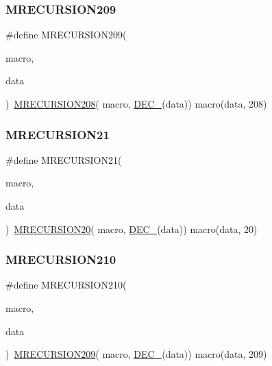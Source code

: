 \subsubsection{\texorpdfstring{MRECURSION209}{MRECURSION209}}
{\footnotesize\ttfamily \#define M\+R\+E\+C\+U\+R\+S\+I\+O\+N209(\begin{DoxyParamCaption}\item[{}]{macro,  }\item[{}]{data }\end{DoxyParamCaption})~\mbox{\hyperlink{group__group__sam0__utils__mrecursion_ga064aaf5aca80528731a580908f6a5142}{M\+R\+E\+C\+U\+R\+S\+I\+O\+N208}}(  macro, \mbox{\hyperlink{group__group__sam0__utils__mrecursion_ga1d23d683797679dca8c3512a54a5dcae}{D\+E\+C\+\_\+}}(data))   macro(data, 208)}

\mbox{\label{group__group__sam0__utils__mrecursion_ga077fdbda319ee988c77241afa1ff82f9}} 
\subsubsection{\texorpdfstring{MRECURSION21}{MRECURSION21}}
{\footnotesize\ttfamily \#define M\+R\+E\+C\+U\+R\+S\+I\+O\+N21(\begin{DoxyParamCaption}\item[{}]{macro,  }\item[{}]{data }\end{DoxyParamCaption})~\mbox{\hyperlink{group__group__sam0__utils__mrecursion_ga478355d5095a62f243dae4c9de56094c}{M\+R\+E\+C\+U\+R\+S\+I\+O\+N20}}(  macro, \mbox{\hyperlink{group__group__sam0__utils__mrecursion_ga1d23d683797679dca8c3512a54a5dcae}{D\+E\+C\+\_\+}}(data))   macro(data, 20)}

\mbox{\label{group__group__sam0__utils__mrecursion_ga70903b9009c4d93b5e6bd6dcd052023f}} 
\subsubsection{\texorpdfstring{MRECURSION210}{MRECURSION210}}
{\footnotesize\ttfamily \#define M\+R\+E\+C\+U\+R\+S\+I\+O\+N210(\begin{DoxyParamCaption}\item[{}]{macro,  }\item[{}]{data }\end{DoxyParamCaption})~\mbox{\hyperlink{group__group__sam0__utils__mrecursion_ga414e00269be46274269d32c3441760ff}{M\+R\+E\+C\+U\+R\+S\+I\+O\+N209}}(  macro, \mbox{\hyperlink{group__group__sam0__utils__mrecursion_ga1d23d683797679dca8c3512a54a5dcae}{D\+E\+C\+\_\+}}(data))   macro(data, 209)}


